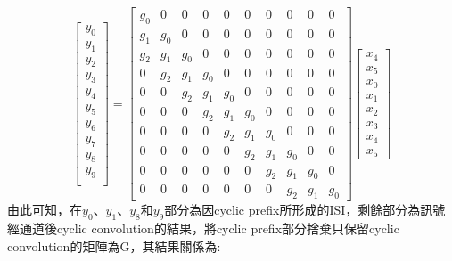\documentclass[12pt,a4paper]{article} %
\begin{document}
\[
\begin{bmatrix}
y_0\\
y_1\\
y_2\\
y_3\\
y_4\\
y_5\\
y_6\\
y_7\\
y_8\\
y_9\\
\end{bmatrix}=
\begin{bmatrix}
g_0 & 0 & 0 & 0 & 0 & 0 & 0 & 0 & 0 & 0 \\
g_1 & g_0 & 0 & 0 & 0 & 0 & 0 & 0 & 0 & 0 \\
g_2 & g_1 & g_0 & 0 & 0 & 0 & 0 & 0 & 0 & 0 \\
0 & g_2 & g_1 & g_0 & 0 & 0 & 0 & 0 & 0 & 0 \\
0 & 0 & g_2 & g_1 & g_0 & 0 & 0 & 0 & 0 & 0 \\
0 & 0 & 0 & g_2 & g_1 & g_0 & 0 & 0 & 0 & 0 \\
0 & 0 & 0 & 0 & g_2 & g_1 & g_0 & 0 & 0 & 0 \\
0 & 0 & 0 & 0 & 0 & g_2 & g_1 & g_0 & 0 & 0 \\
0 & 0 & 0 & 0 & 0 & 0 & g_2 & g_1 & g_0 & 0 \\
0 & 0 & 0 & 0 & 0 & 0 & 0 & g_2 & g_1 & g_0
\end{bmatrix}
\begin{bmatrix}
x_4 \\
x_5 \\
x_0 \\
x_1 \\
x_2 \\
x_3 \\
x_4 \\
x_5
\end{bmatrix}
\]
由此可知，在$y_0$、$y_1$、$y_8$和$y_9$部分為因cyclic prefix所形成的ISI，剩餘部分為訊號經通道後cyclic convolution的結果，將cyclic prefix部分捨棄只保留cyclic convolution的矩陣為G，其結果關係為:
\end{document}
